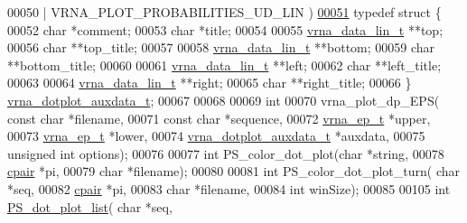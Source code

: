 \begin{DoxyCode}
00050 \textcolor{preprocessor}{                                            | VRNA\_PLOT\_PROBABILITIES\_UD\_LIN )}
\hyperlink{group__plotting__utils}{00051} \textcolor{keyword}{typedef} \textcolor{keyword}{struct }\{
00052   \textcolor{keywordtype}{char}            *comment;
00053   \textcolor{keywordtype}{char}            *title;
00054 
00055   \hyperlink{group__data__structures_structvrna__data__linear__s}{vrna\_data\_lin\_t} **top;
00056   \textcolor{keywordtype}{char}            **top\_title;
00057 
00058   \hyperlink{group__data__structures_structvrna__data__linear__s}{vrna\_data\_lin\_t} **bottom;
00059   \textcolor{keywordtype}{char}            **bottom\_title;
00060 
00061   \hyperlink{group__data__structures_structvrna__data__linear__s}{vrna\_data\_lin\_t} **left;
00062   \textcolor{keywordtype}{char}            **left\_title;
00063 
00064   \hyperlink{group__data__structures_structvrna__data__linear__s}{vrna\_data\_lin\_t} **right;
00065   \textcolor{keywordtype}{char}            **right\_title;
00066 \} \hyperlink{group__plotting__utils_structvrna__dotplot__auxdata__t}{vrna\_dotplot\_auxdata\_t};
00067 
00068 
00069 \textcolor{keywordtype}{int}
00070 vrna\_plot\_dp\_EPS( \textcolor{keyword}{const} \textcolor{keywordtype}{char}              *filename,
00071                   \textcolor{keyword}{const} \textcolor{keywordtype}{char}              *sequence,
00072                   \hyperlink{group__struct__utils_structvrna__elem__prob__s}{vrna\_ep\_t}               *upper,
00073                   \hyperlink{group__struct__utils_structvrna__elem__prob__s}{vrna\_ep\_t}               *lower,
00074                   \hyperlink{group__plotting__utils_structvrna__dotplot__auxdata__t}{vrna\_dotplot\_auxdata\_t}  *auxdata,
00075                   \textcolor{keywordtype}{unsigned} \textcolor{keywordtype}{int}            options);
00076 
00077 \textcolor{keywordtype}{int} PS\_color\_dot\_plot(\textcolor{keywordtype}{char} *\textcolor{keywordtype}{string},
00078                       \hyperlink{group__data__structures_structvrna__cpair__s}{cpair} *pi,
00079                       \textcolor{keywordtype}{char} *filename);
00080 
00081 \textcolor{keywordtype}{int} PS\_color\_dot\_plot\_turn( \textcolor{keywordtype}{char} *seq,
00082                             \hyperlink{group__data__structures_structvrna__cpair__s}{cpair} *pi,
00083                             \textcolor{keywordtype}{char} *filename,
00084                             \textcolor{keywordtype}{int} winSize);
00085 
00105 \textcolor{keywordtype}{int} \hyperlink{group__plotting__utils_ga00ea223b5cf02eb2faae5ff29f0d5e12}{PS\_dot\_plot\_list}( \textcolor{keywordtype}{char} *seq,

\end{DoxyCode}
